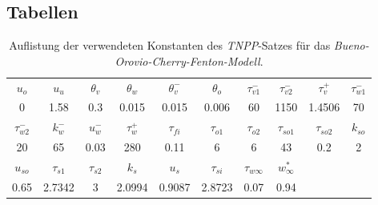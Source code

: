 \begin{appendices}

\chapter{Tabellen}

\begin{table}[h]
	\centering
	\begin{tabular}{cccccccccc}
		\hline
		$u_o$ & $u_u$ & $\theta_v$ & $\theta_w$ & $\theta_v^-$ & $\theta_o$ & $\tau_{v1}^-$ & $\tau_{v2}^-$ & $\tau_v^+$ & $\tau_{w1}^-$\\
		0 & 1.58 & 0.3 & 0.015 & 0.015 & 0.006 & 60 & 1150 & 1.4506 & 70 \\
		\hline
		 $\tau_{w2}^-$ & $k_w^-$ & $u_w^-$ & $\tau_w^+$ & $\tau_{fi}$ & $\tau_{o1}$ & $\tau_{o2}$ & $\tau_{so1}$ & $\tau_{so2}$ & $k_{so}$\\
		20 & 65 & 0.03 & 280 & 0.11 & 6 & 6 & 43 & 0.2 & 2\\
		\hline

		$u_{so}$ & $\tau_{s1}$ & $\tau_{s2}$ & $k_s$ & $u_s$ & $\tau_{si}$ & $\tau_{w\infty}$ & $w_\infty^*$ &&\\
		0.65 & 2.7342 & 3 & 2.0994 & 0.9087 & 2.8723 & 0.07 & 0.94 &&\\
		\hline
	\end{tabular}
		\caption{Auflistung der verwendeten Konstanten des \textit{TNPP}-Satzes für das \textit{Bueno-Orovio-Cherry-Fenton-Modell}.}
\label{tab:apx_bocf_tnpp_constants}	
	\end{table}

\begin{table}[h]
	\centering


\end{table}
\end{appendices}

